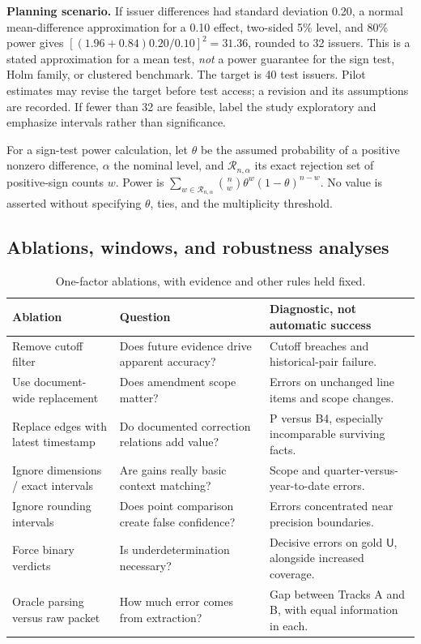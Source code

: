 \documentclass[11pt,a4paper]{article}
\newcommand{\pbreak}{\clearpage}
\newcommand{\lead}[1]{\textbf{\color{navy}#1}}
\newcommand{\Ulabel}{\mathsf{U}}
\begin{document}
\lead{Planning scenario.} If issuer differences had standard deviation 0.20, a normal mean-difference approximation for a 0.10 effect, two-sided 5\% level, and 80\% power gives $[(1.96+0.84)0.20/0.10]^2=31.36$, rounded to 32 issuers. This is a stated approximation for a mean test, \emph{not} a power guarantee for the sign test, Holm family, or clustered benchmark. The target is 40 test issuers. Pilot estimates may revise the target before test access; a revision and its assumptions are recorded. If fewer than 32 are feasible, label the study exploratory and emphasize intervals rather than significance.

For a sign-test power calculation, let $\theta$ be the assumed probability of a positive nonzero difference, $\alpha$ the nominal level, and $\mathcal R_{n,\alpha}$ its exact rejection set of positive-sign counts $w$. Power is $\sum_{w\in\mathcal R_{n,\alpha}}\binom nw\theta^w(1-\theta)^{n-w}$. No value is asserted without specifying $\theta$, ties, and the multiplicity threshold.

\pbreak
\subsection{Ablations, windows, and robustness analyses}
\begin{table}[H]\caption{One-factor ablations, with evidence and other rules held fixed.}
\small\begin{tabularx}{\linewidth}{p{.28\linewidth}YY}\toprule
Ablation & Question & Diagnostic, not automatic success\\\midrule
Remove cutoff filter & Does future evidence drive apparent accuracy? & Cutoff breaches and historical-pair failure.\\
Use document-wide replacement & Does amendment scope matter? & Errors on unchanged line items and scope changes.\\
Replace edges with latest timestamp & Do documented correction relations add value? & P versus B4, especially incomparable surviving facts.\\
Ignore dimensions / exact intervals & Are gains really basic context matching? & Scope and quarter-versus-year-to-date errors.\\
Ignore rounding intervals & Does point comparison create false confidence? & Errors concentrated near precision boundaries.\\
Force binary verdicts & Is underdetermination necessary? & Decisive errors on gold $\Ulabel$, alongside increased coverage.\\
Oracle parsing versus raw packet & How much error comes from extraction? & Gap between Tracks A and B, with equal information in each.\\\bottomrule
\end{tabularx}\end{table}
\end{document}
